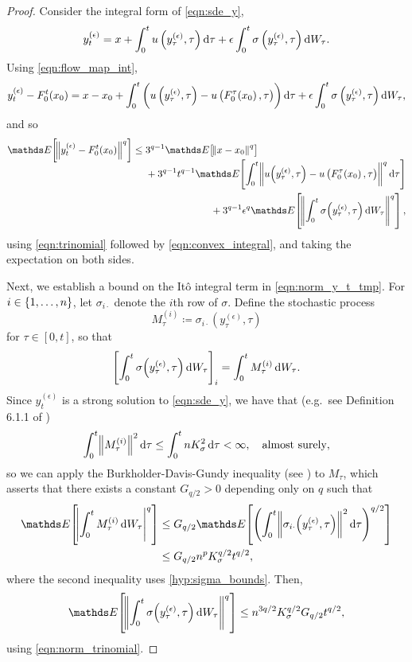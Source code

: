 \begin{proof}
	Consider the integral form of \cref{eqn:sde_y},
	\[
		y_t^{(\epsilon)} = x + \int_0^t{u\left(y_\tau^{(\epsilon)}, \tau\right)\dif\tau} + \epsilon\int_0^t{\sigma\left(y_\tau^{(\epsilon)}, \tau\right)\dif W_\tau}.
	\]
	Using \cref{eqn:flow_map_int},
	\[
		y_t^{(\epsilon)} - F_0^t\!\left(x_0\right) = x - x_0 + \int_0^{t}{\left(u\left(y_\tau^{(\epsilon)}, \tau\right) - u\left(F_0^{\tau}\!\left(x_0\right), \tau\right)\right)\dif\tau} + \epsilon\int_0^t{\sigma\left(y_\tau^{(\epsilon)}, \tau\right)\dif W_\tau},
	\]
	and so
	\begin{equation}
		\avg{\norm{y_t^{(\epsilon)} - F_0^t\!\left(x_0\right)}^q} \leq \begin{multlined}[t]
			3^{q-1}\avg{\norm{x - x_0}^q} \\
			+ 3^{q-1}t^{q-1}\avg{\int_0^{t}{\norm{u\!\left(y_\tau^{(\epsilon)}, \tau\right) - u\left(F_0^{\tau}\!\left(x_0\right), \tau\right)}^q\dif\tau}} \\
			+ 3^{q-1}\epsilon^q\avg{\norm{\int_0^t{\sigma\!\left(y_\tau^{(\epsilon)}, \tau\right)\dif W_\tau}}^q},
		\end{multlined}
		\label{eqn:norm_y_t_tmp}
	\end{equation}
	using \cref{eqn:trinomial} followed by \cref{eqn:convex_integral}, and taking the expectation on both sides.

	Next, we establish a bound on the It\^o integral term in \cref{eqn:norm_y_t_tmp}.
	For \(i \in \set{1,\hdots,n}\), let \(\sigma_{i\cdot}\) denote the \(i\)th row of \(\sigma\).
	Define the stochastic process
	\[
		M_\tau^{(i)} \coloneqq \sigma_{i\cdot}\!\left(y_\tau^{(\epsilon)}, \tau\right)
	\]
	for \(\tau \in [0,t]\), so that
	\[
		\left[\int_0^t{\sigma\!\left(y_\tau^{(\epsilon)}, \tau\right)\dif W_\tau}\right]_i = \int_0^t{M_\tau^{(i)}\dif W_\tau}.
	\]
	Since \(y_t^{(\epsilon)}\) is a strong solution to \cref{eqn:sde_y}, we have that (e.g.\ see Definition 6.1.1 of \citet{KallianpurSundar_2014_StochasticAnalysisDiffusion})
	\[
		\int_0^t{\norm{M_\tau^{(i)}}^2\dif\tau} \leq \int_0^t{nK_\sigma^2\dif\tau} < \infty, \quad \text{almost surely},
	\]
	so we can apply the Burkholder-Davis-Gundy inequality (see ) to \(M_\tau\), which asserts that there exists a constant \(G_{q/2} > 0\) depending only on \(q\) such that
	\begin{align*}
		\avg{\abs{\int_0^t{M_\tau^{(i)}\dif W_\tau}}^{q}} & \leq G_{q/2} \avg{\left(\int_{0}^t{\norm{\sigma_{i\cdot}\!\left(y_\tau^{(\epsilon)}, \tau\right)}^2\dif\tau}\right)^{q/2}} \\
		                                                  & \leq G_{q/2} n^p K_{\sigma}^{q/2} t^{q/2},
	\end{align*}
	where the second inequality uses \ref{hyp:sigma_bounds}.
	Then,
	\begin{equation}
		\avg{\norm{\int_0^t{\sigma\!\left(y_\tau^{(\epsilon)}, \tau\right)\dif W_\tau}}^{q}} \leq n^{3q/2} K_\sigma^{q/2} G_{q/2} t^{q/2},
		\label{eqn:z_sigma_bound}
	\end{equation}
	using \cref{eqn:norm_trinomial}.


\end{proof}
